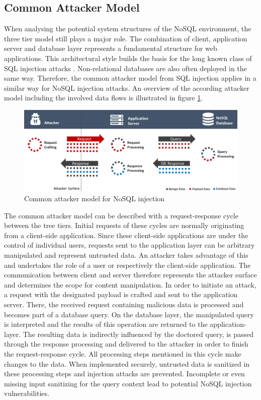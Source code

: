\subsection{Common Attacker Model}
\label{sec:commonAttackerModel}
When analysing the potential system structures of the NoSQL environment, the three tier model still plays a major role. The combination of client, application server and database layer represents a fundamental structure for web applications. This architectural style builds the basis for the long known class of SQL injection attacks \cite{OWASP:2016}. Non-relational databases are also often deployed in the same way. Therefore, the common attacker model from SQL injection applies in a similar way for NoSQL injection attacks. An overview of the according attacker model including the involved data flows is illustrated in figure \ref{fig:normalAttackerModel}.

\begin{figure}[h]
\centering
  \includegraphics[width=1\linewidth]{Images/attacker_model_normal}
  \caption{Common attacker model for NoSQL injection}
  \label{fig:normalAttackerModel}
\end{figure}

The common attacker model can be described with a request-response cycle between the tree tiers. Initial requests of these cycles are normally originating from a client-side application. Since these client-side applications are under the control of individual users, requests sent to the application layer can be arbitrary manipulated and represent untrusted data. An attacker takes advantage of this and undertakes the role of a user or respectively the client-side application. The communication between client and server therefore represents the attacker surface and determines the scope for content manipulation. In order to initiate an attack, a request with the designated payload is crafted and sent to the application server. There, the received request containing malicious data is processed and becomes part of a database query. On the database layer, the manipulated query is interpreted and the results of this operation are returned to the application-layer. The resulting data is indirectly influenced by the doctored query, is passed through the response processing and delivered to the attacker in order to finish the request-response cycle. All processing steps mentioned in this cycle make changes to the data. When implemented securely, untrusted data is sanitized in these processing steps and injection attacks are prevented. Incomplete or even missing input sanitizing for the query context lead to potential NoSQL injection vulnerabilities.\\

